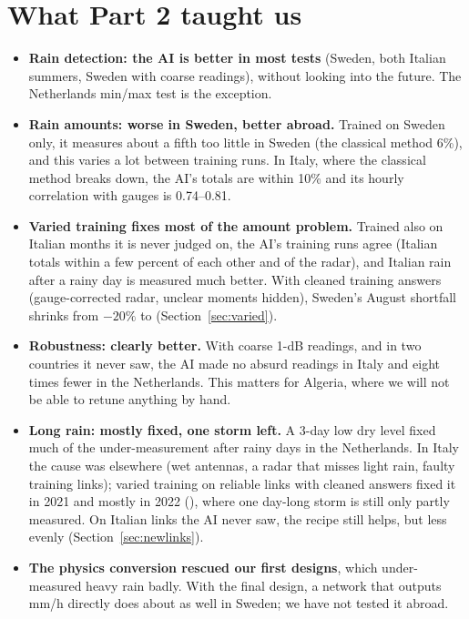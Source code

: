 \section{What Part 2 taught us}
\label{sec:phase2_end}

\begin{itemize}
\item \textbf{Rain detection: the AI is better in most tests} (Sweden, both Italian summers, Sweden with coarse
readings), without looking into the future. The Netherlands min/max test is the exception.
\item \textbf{Rain amounts: worse in Sweden, better abroad.} Trained on Sweden only, it measures about a fifth too little
in Sweden (the classical method 6\%), and this varies a lot between training runs. In Italy, where the classical method
breaks down, the AI's totals are within 10\% and its hourly correlation with gauges is 0.74--0.81.
\item \textbf{Varied training fixes most of the amount problem.} Trained also on Italian months it is never judged on,
the AI's training runs agree (Italian totals within a few percent of each other and of the radar), and Italian rain after a
rainy day is measured much better. With cleaned training answers (gauge-corrected radar, unclear moments hidden), Sweden's August shortfall shrinks
from $-20\%$ to \CVfinSeBias{} (Section~\ref{sec:varied}).
\item \textbf{Robustness: clearly better.} With coarse 1-dB readings, and in two countries it never saw, the AI made
no absurd readings in Italy and eight times fewer in the Netherlands. This matters for Algeria, where we will not be able
to retune anything by hand.
\item \textbf{Long rain: mostly fixed, one storm left.} A 3-day low dry level fixed much of the under-measurement after
rainy days in the Netherlands. In Italy the cause was elsewhere (wet antennas, a radar that misses light rain, faulty
training links); varied training on reliable links with cleaned answers fixed it in 2021 and mostly in 2022 (\CVfinLongBd), where one
day-long storm is still only partly measured. On Italian links the AI never saw, the recipe still helps, but less evenly (Section~\ref{sec:newlinks}).
\item \textbf{The physics conversion rescued our first designs}, which under-measured heavy rain badly. With the final
design, a network that outputs mm/h directly does about as well in Sweden; we have not tested it abroad.

\end{itemize}
